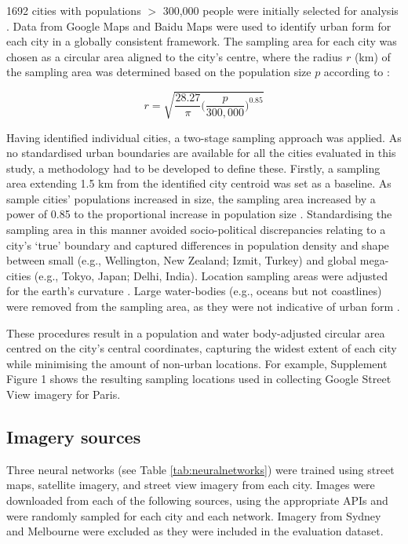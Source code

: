 \documentclass[Crown,sageh,times]{sagej}
\begin{document}
1692 cities with populations $>$ 300,000 people were initially selected for analysis \citep{UN2014}. Data from Google Maps and Baidu Maps were used to identify urban form for each city in a globally consistent framework. The sampling area for each city was chosen as a circular area aligned to the city's centre, where the radius $r$ (km) of the sampling area was determined based on the population size $p$ according to \citet{Barthelemy2016}: 

\begin{equation}
r = \sqrt{ \frac{28.27}{\pi} \bigg( \frac{p}{300,000}  \bigg)^{0.85} }
\end{equation}


Having identified individual cities, a two-stage sampling approach was applied. As no standardised urban boundaries are available for all the cities evaluated in this study, a methodology had to be developed to define these. Firstly, a sampling area extending 1.5 km from the identified city centroid \citep{UN2014} was set as a baseline. As sample cities' populations increased in size, the sampling area increased by a power of 0.85 to the proportional increase in population size \citep{Barthelemy2016}. Standardising the sampling area in this manner avoided socio-political discrepancies relating to a city's `true' boundary and captured differences in population density and shape between small (e.g., Wellington, New Zealand; Izmit, Turkey) and global mega-cities (e.g., Tokyo, Japan;  Delhi, India). Location sampling areas were adjusted for the earth's curvature \citep{Sinnott1984}. Large water-bodies (e.g., oceans but not coastlines) were removed from the sampling area, as they were not indicative of urban form . 

These procedures result in a population and water body-adjusted circular area centred on the city's central coordinates, capturing the widest extent of each city while minimising the amount of non-urban locations. For example, Supplement Figure 1 shows the resulting sampling locations used in collecting Google Street View imagery for Paris. 




\label{methodsimagery}
\subsection{Imagery sources}

Three neural networks (see Table \ref{tab:neuralnetworks}) were trained using street maps, satellite imagery, and street view imagery from each city. Images were downloaded from each of the following sources, using the appropriate APIs and were randomly sampled for each city and each network. Imagery from Sydney and Melbourne were excluded as they were included in the evaluation dataset. 
\end{document}
